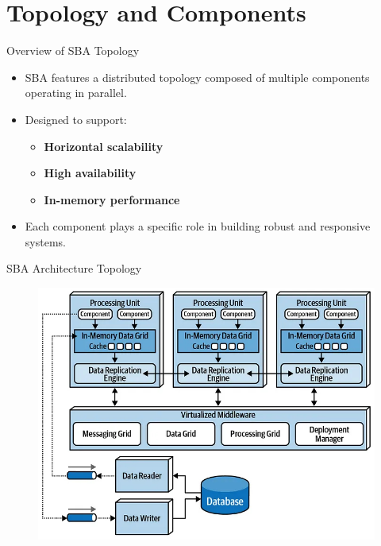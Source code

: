 \documentclass[aspectratio=169, table]{beamer}
\begin{document}
	
	
	\section{Topology and Components}
	
	\begin{frame}{Overview of SBA Topology}
		\vspace{20pt}
		\begin{itemize}
			\item SBA features a distributed topology composed of multiple components operating in parallel.
			\item Designed to support:
			\begin{itemize}
				\item \textbf{Horizontal scalability}
				\item \textbf{High availability}
				\item \textbf{In-memory performance}
			\end{itemize}
			\item Each component plays a specific role in building robust and responsive systems.
		\end{itemize}
	\end{frame}
	
	\begin{frame}{SBA Architecture Topology}
		\vspace{20pt}
		\begin{figure}
			\centering
			\includegraphics[height=0.8\textheight]{../../images/spaced-based_architecture.jpg}
			\label{fig:space-based_architecture}
		\end{figure}
	\end{frame}
	
\end{document}

